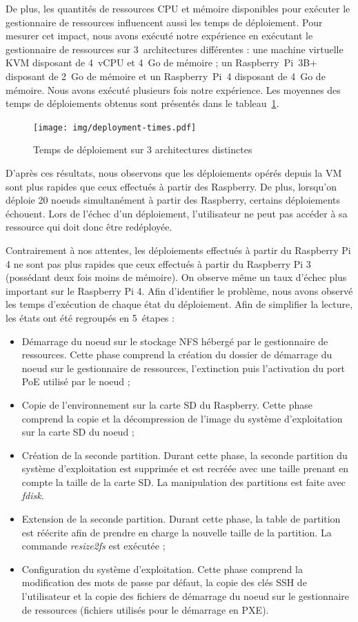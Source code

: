 \documentclass[letterpaper, 10 pt, conference]{ieeeconf}
\begin{document}
De plus, les quantités de ressources CPU et mémoire disponibles pour exécuter le gestionnaire de ressources influencent aussi les temps de déploiement. Pour mesurer cet impact, nous avons exécuté notre expérience en exécutant le gestionnaire de ressources sur 3~architectures différentes : une machine virtuelle KVM disposant de 4~vCPU et 4~Go de mémoire ; un Raspberry~Pi~3B+ disposant de 2~Go de mémoire et un Raspberry~Pi~4 disposant de 4~Go de mémoire. Nous avons exécuté plusieurs fois notre expérience. Les moyennes des temps de déploiements obtenus sont présentés dans le tableau~\ref{fig:dtime}.

\begin{figure}[htb]
  \texttt{[image: img/deployment-times.pdf]}
  \caption{Temps de déploiement sur 3 architectures distinctes}
  \label{fig:dtime}
\end{figure}

D'après ces résultats, nous observons que les déploiements opérés depuis la VM sont plus rapides que ceux effectués à partir des Raspberry. De plus, lorsqu'on déploie 20 noeuds simultanément à partir des Raspberry, certains déploiements échouent. Lors de l'échec d'un déploiement, l'utilisateur ne peut pas accéder à sa ressource qui doit donc être redéployée.

Contrairement à nos attentes, les déploiements effectués à partir du Raspberry Pi 4 ne sont pas plus rapides que ceux effectués à partir du Raspberry Pi 3 (possédant deux fois moins de mémoire). On observe même un taux d'échec plus important sur le Raspberry Pi 4. Afin d'identifier le problème, nous avons observé les temps d'exécution de chaque état du déploiement. Afin de simplifier la lecture, les états ont été regroupés en 5~étapes :
\begin{itemize}
    \item Démarrage du noeud sur le stockage NFS hébergé par le gestionnaire de ressources. Cette phase comprend la création du dossier de démarrage du noeud sur le gestionnaire de ressources, l'extinction puis l'activation du port PoE utilisé par le noeud ;
    \item Copie de l'environnement sur la carte SD du Raspberry. Cette phase comprend la copie et la décompression de l'image du système d'exploitation sur la carte SD du noeud ;
    \item Création de la seconde partition. Durant cette phase, la seconde partition du système d'exploitation est supprimée et est recréée avec une taille prenant en compte la taille de la carte SD. La manipulation des partitions est faite avec \textit{fdisk}.
    \item Extension de la seconde partition. Durant cette phase, la table de partition est réécrite afin de prendre en charge la nouvelle taille de la partition. La commande \textit{resize2fs} est exécutée ;
    \item Configuration du système d'exploitation. Cette phase comprend la modification des mots de passe par défaut, la copie des clés SSH de l'utilisateur et la copie des fichiers de démarrage du noeud sur le gestionnaire de ressources (fichiers utilisés pour le démarrage en PXE).
\end{itemize}
\end{document}
